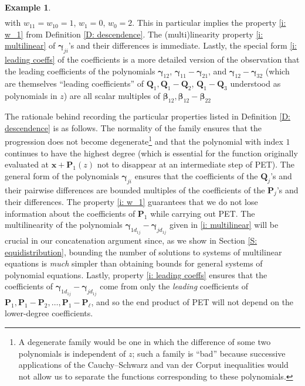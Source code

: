 \documentclass[11pt]{amsart}
\theoremstyle{definition}
\newtheorem{example}[lemma]{Example} %
\newcommand{\p}{{\mathbf{P}}}
\newcommand{\bq}{{\mathbf{Q}}}
\newcommand{\q}{{\mathbf{Q}}}
\newcommand{\bx}{{\mathbf{x}}}
\newcommand{\bgamma}{{\boldsymbol{\gamma}}}
\newcommand{\bbeta}{{\boldsymbol{\beta}}}
\begin{document}
{\begin{example}
\begin{align*}
    \end{align*}
    with $w_{11} = w_{10} = 1$, $w_1 = 0$, $w_0 = 2$. This in particular implies the property \eqref{i: w_1} from Definition \ref{D: descendence}. The (multi)linearity property \eqref{i: multilinear} of $\bgamma_{ji}$'s and their differences is immediate. Lastly, the special form \eqref{i: leading coeffs} of the coefficients is a more detailed version of the observation that the leading coefficients of the polynomials $\bgamma_{12}$, $\bgamma_{11}-\bgamma_{21}$, and $\bgamma_{12}-\bgamma_{32}$ (which are themselves ``leading coefficients'' of $\bq_1, \bq_1-\bq_2$, $\bq_1 - \bq_3$ understood as polynomials in $z$) are all scalar multiples of $\bbeta_{12}, \bbeta_{12}-\bbeta_{22}$
 
      \end{example}}
            The rationale behind recording the particular properties listed in Definition \ref{D: descendence} is as follows. The normality of the family ensures that the progression does not become degenerate\footnote{A degenerate family would be one in which the difference of some two polynomials is independent of $z$; such a family is ``bad'' because successive applications of the Cauchy--Schwarz and van der Corput inequalities would not allow us to separate the functions corresponding to these polynomials.} and that the polynomial with index $1$ continues to have the highest degree (which is essential for the function originally evaluated at $\bx + \p_1(z)$ not to disappear at an intermediate step of PET). 
            The general form of the polynomials $\bgamma_{ji}$ ensures that the coefficients of the $\q_j$'s and their pairwise differences are bounded multiples of the coefficients of the $\p_j$'s and their differences. The property \eqref{i: w_1} guarantees that we do not lose information about the coefficients of $\p_1$ while carrying out PET.
            The multilinearity of the polynomials $\bgamma_{1d_{1j}}-\bgamma_{jd_{1j}}$ given in \eqref{i: multilinear} will be crucial in our concatenation argument since, as we show in Section \ref{S: equidistribution}, bounding the number of solutions to systems of multilinear equations is \textit{much} simpler than obtaining bounds for general systems of polynomial equations. Lastly, property \eqref{i: leading coeffs} ensures that the coefficients of $\bgamma_{1d_{1j}}-\bgamma_{jd_{1j}}$ come from only the \textit{leading} coefficients of $\p_1, \p_1-\p_2, \ldots, \p_1-\p_\ell$, and so the end product of PET will not depend on the lower-degree coefficients.
\end{document}
